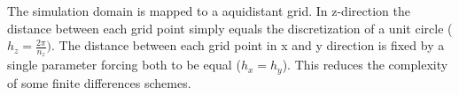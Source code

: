 \documentclass[master.tex]{subfiles}
\begin{document}
The simulation domain is mapped to a aquidistant grid. In z-direction the distance between each grid point simply equals the discretization of a unit circle ($h_z= \frac{2\pi}{n_z})$. The distance between each grid point in x and y direction is fixed by a single parameter forcing both to be equal ($h_x = h_y$). This reduces the complexity of some finite differences schemes. 
\end{document}

